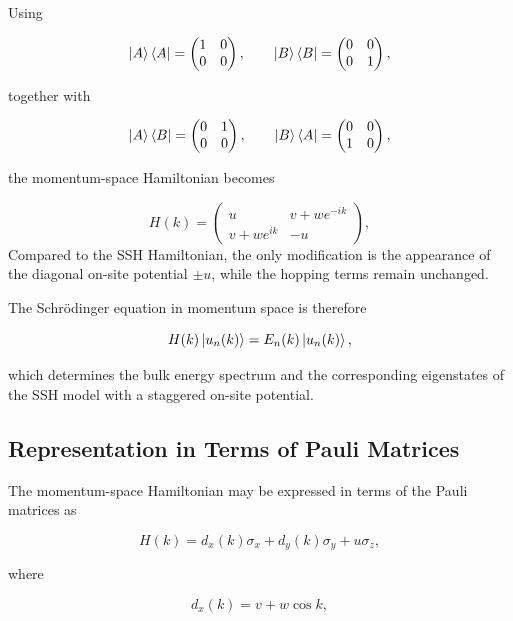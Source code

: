 \documentclass[11pt, a4paper]{article}
\begin{document}
Using

\[
\ket{A}\bra{A}
=
\begin{pmatrix}
1&0\\
0&0
\end{pmatrix},
\qquad
\ket{B}\bra{B}
=
\begin{pmatrix}
0&0\\
0&1
\end{pmatrix},
\]

together with

\[
\ket{A}\bra{B}
=
\begin{pmatrix}
0&1\\
0&0
\end{pmatrix},
\qquad
\ket{B}\bra{A}
=
\begin{pmatrix}
0&0\\
1&0
\end{pmatrix},
\]

the momentum-space Hamiltonian becomes

\begin{equation}
H(k)
=
\begin{pmatrix}
u &
v+we^{-ik}
\\
v+we^{ik} &
-u
\end{pmatrix},
\label{eq:momentum_space_Hamiltonian_u}
\end{equation}
Compared to the SSH Hamiltonian, the only modification is the appearance of the diagonal on-site potential $\pm u$, while the hopping terms remain unchanged.

The Schr\"odinger equation in momentum space is therefore

\begin{equation*}
H(k)\ket{u_n(k)}
=
E_n(k)\ket{u_n(k)},
\end{equation*}

which determines the bulk energy spectrum and the corresponding eigenstates of the SSH model with a staggered on-site potential.



\subsection{Representation in Terms of Pauli Matrices}

The momentum-space Hamiltonian may be expressed in terms of the Pauli matrices as

\[
H(k)
=
d_x(k)\sigma_x
+
d_y(k)\sigma_y
+
u\sigma_z,
\]

where

\[
d_x(k)=v+w\cos k,
\]
\end{document}
